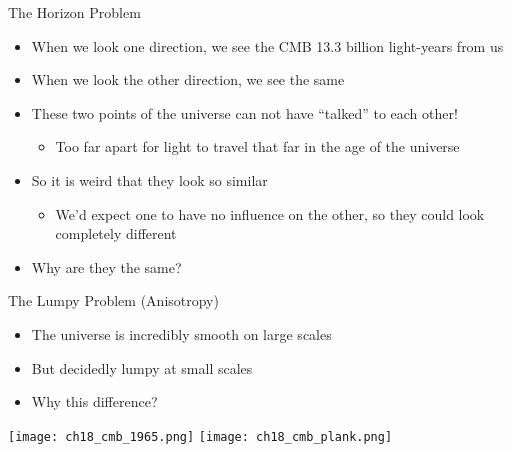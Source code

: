 \documentclass[pdf,aspectratio=169]{beamer}
\begin{document}
\begin{frame}{The Horizon Problem}
  \begin{itemize}
	\item When we look one direction, we see the CMB 13.3 billion light-years from us
	\item When we look the other direction, we see the same
	\item These two points of the universe can not have ``talked'' to each other!
	  \begin{itemize}
		\item Too far apart for light to travel that far in the age of the universe
	  \end{itemize}
	\item So it is weird that they look so similar
	  \begin{itemize}
		\item We'd expect one to have no influence on the other, so they could look completely different
	  \end{itemize}
	\item Why are they the same?
  \end{itemize}
\end{frame}

\begin{frame}{The Lumpy Problem (Anisotropy)}
  \begin{itemize}
	\item The universe is incredibly smooth on large scales
	\item But decidedly lumpy at small scales
	\item Why this difference?
  \end{itemize}
  \begin{center}
	\texttt{[image: ch18\_cmb\_1965.png]}
	\texttt{[image: ch18\_cmb\_plank.png]}
  \end{center}
\end{frame}
\end{document}
